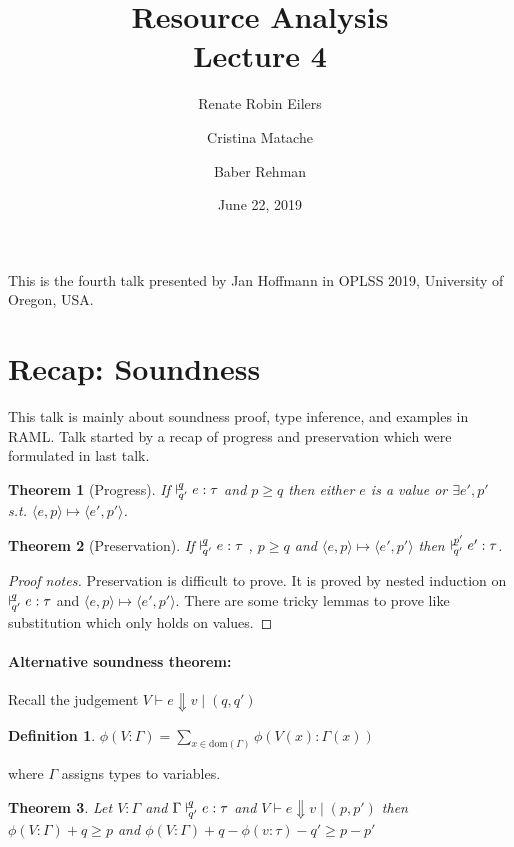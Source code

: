 \documentclass{article}
\title{Resource Analysis \\ \Large{Lecture 4}}
\author{Renate Robin Eilers  \and Cristina Matache \and Baber Rehman}
\date{June 22, 2019}
\newtheorem{theorem}{Theorem}[section]
\newtheorem{definition}{Definition}[theorem]
\newcommand{\ldash}[2]{\vdash^{\hspace{-.4em}#1}_{\hspace{-.4em}#2}}
\begin{document}
\maketitle

This is the fourth talk presented by Jan Hoffmann in OPLSS 2019, University of Oregon, USA.

\section{Recap: Soundness}

This talk is mainly about soundness proof, type inference, and examples in RAML. Talk started by a recap of progress and preservation which were formulated in last talk.

\begin{theorem}[Progress]
If $\ldash{q}{q'} e : \tau $ and $p \geq q$ then either $e$ is a value or $\exists e',p'$ s.t. $\langle e,p \rangle \mapsto \langle e',p'\rangle$.
\end{theorem}

\begin{theorem}[Preservation]
If $\ldash{q}{q'} e : \tau$ , $p \geq q$ and   $\langle e,p \rangle \mapsto \langle e',p'\rangle$ then $\ldash{p'}{q'} e': \tau$.
\end{theorem}
\begin{proof}[Proof notes]
  Preservation is difficult to prove. It is proved by nested induction on $\ldash{q}{q'} e : \tau$ and $\langle e,p \rangle \mapsto \langle e',p'\rangle$.
  There are some tricky lemmas to prove like substitution which only holds on values.
\end{proof}

\paragraph{Alternative soundness theorem:}

Recall the judgement $V \vdash e \Downarrow v \mid (q,q')$
\begin{definition}
$\phi(V : \Gamma) = \sum_{x \in \text{dom}(\Gamma)} \phi(V(x) : \Gamma(x)) $
\end{definition}
where $\Gamma $ assigns types to variables.

\begin{theorem}
Let $V : \Gamma$ and $\Gamma \ldash{q}{q'} e : \tau$ and $V \vdash e \Downarrow v \mid (p,p')$ then $\phi(V:\Gamma) + q \geq p$ and $\phi (V : \Gamma) +  q - \phi (v : \tau) -q' \geq p - p'$
\end{theorem}
\end{document}

